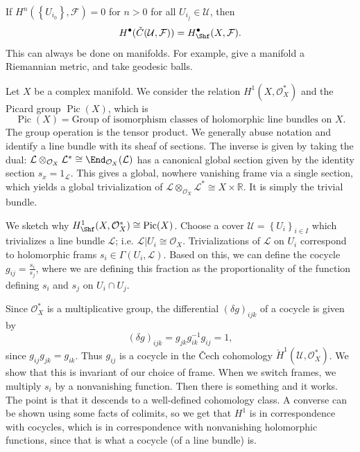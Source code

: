 
\begin{theorem}[\v{C}ech]\label{thm:4.2.5}
	If $H^n(\left\{ U_{i_0}  \right\} ,\mathcal{F} ) = 0$ for $n>0$ for all $U_{i_j} \in \mathcal{U} $, then
	\[
		H^{\bullet} (\check{C}(\mathcal{U} ,\mathcal{F} ))=H^{\bullet}_{\Shf } (X,\mathcal{F} )
	.\]
	This can always be done on manifolds. For example, give a manifold a Riemannian metric, and take geodesic balls.
\end{theorem}

Let $X$ be a complex manifold. We consider the relation $H^1(X,\mathcal{O} _X^*)$ and the Picard group $\operatorname{Pic} (X)$, which is
\[
	\operatorname{Pic} (X) = \text{Group of isomorphism classes of holomorphic line bundles on } X
.\]
The group operation is the tensor product. We generally abuse notation and identify a line bundle with its sheaf of sections. The inverse is given by taking the dual: $\mathcal{L} \otimes_{\mathcal{O} _X} \mathcal{L} ^* \cong \End_{\mathcal{O} _X}(\mathcal{L} )$ has a canonical global section given by the identity section $s_x = 1_{\mathcal{L}} $. This gives a global, nowhere vanishing frame via a single section, which yields a global trivialization of $\mathcal{L} \otimes _{\mathcal{O} _X} \mathcal{L} ^* \cong X\times \mathbb{R} $. It is simply the trivial bundle.

We sketch why $H^1_{\Shf } (X,\mathcal{O} _X^*) \cong \operatorname{Pic} (X)$. Choose a cover $\mathcal{U} =\left\{ U_i \right\} _{i\in I} $ which trivializes a line bundle $\mathcal{L} $; i.e. $\mathcal{L} |U_i \cong \mathcal{O} _X$. Trivializations of $\mathcal{L} $ on $U_i$ correspond to holomorphic frams $s_i\in \Gamma (U_i,\mathcal{L} )$. Based on this, we can define the cocycle $g_{ij} =\frac{s_i}{s_j} $, where we are defining this fraction as the proportionality of the function defining $s_i$ and $s_j$ on $U_i \cap U_j$.

Since $\mathcal{O} _X^*$ is a multiplicative group, the differential $(\delta g)_{ijk} $ of a cocycle is given by
\[
	(\delta g)_{ijk} =g_{jk} g_{ik} ^{-1} g_{ij} =1,
\]
since $g_{ij} g_{jk} =g_{ik} $. Thus $g_{ij} $ is a cocycle in the \v{C}ech cohomology $ \check{H}^1(\mathcal{U} ,\mathcal{O} _X^*)$. We show that this is invariant of our choice of frame. When we switch frames, we multiply $s_i$ by a nonvanishing function. Then there is something and it works. The point is that it descends to a well-defined cohomology class. A converse can be shown using some facts of colimits, so we get that $H^1$ is in correspondence with cocycles, which is in correspondence with nonvanishing holomorphic functions, since that is what a cocycle (of a line bundle) is.

